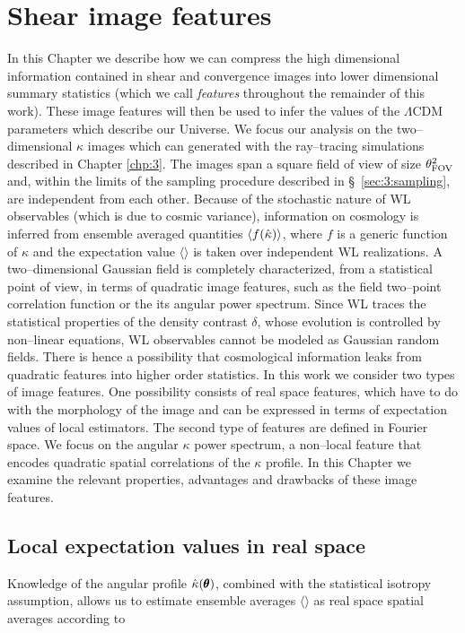 
\chapter{Shear image features}
\lhead[\fancyplain{}{\thepage}]{\fancyplain{}{\rightmark}}
 \thispagestyle{plain}
\setlength{\parindent}{10mm}
\label{chp:4}

In this Chapter we describe how we can compress the high dimensional information contained in shear and convergence images into lower dimensional summary statistics (which we call \textit{features} throughout the remainder of this work). These image features will then be used to infer the values of the $\Lambda$CDM parameters which describe our Universe. We focus our analysis on the two--dimensional $\kappa$ images which can generated with the ray--tracing simulations described in Chapter \ref{chp:3}. The images span a square field of view of size $\theta_{\rm FOV}^2$ and, within the limits of the sampling procedure described in \S~\ref{sec:3:sampling}, are independent from each other. Because of the stochastic nature of WL observables (which is due to cosmic variance), information on cosmology is inferred from ensemble averaged quantities $\langle f(\hat{\kappa})\rangle$, where $f$ is a generic function of $\kappa$ and the expectation value $\langle\rangle$ is taken over independent WL realizations. A two--dimensional Gaussian field is completely characterized, from a statistical point of view, in terms of quadratic image features, such as the field two--point correlation function or the its angular power spectrum. Since WL traces the statistical properties of the density contrast $\delta$, whose evolution is controlled by non--linear equations, WL observables cannot be modeled as Gaussian random fields. There is hence a possibility that cosmological information leaks from quadratic features into higher order statistics. In this work we consider two types of image features. One possibility consists of real space features, which have to do with the morphology of the image and can be expressed in terms of expectation values of local estimators. The second type of features are defined in Fourier space. We focus on the angular $\kappa$ power spectrum, a non--local feature that encodes quadratic spatial correlations of the $\kappa$ profile. In this Chapter we examine the relevant properties, advantages and drawbacks of these image features. 

\section{Local expectation values in real space}
Knowledge of the angular profile $\hat{\kappa}(\pmb{\theta})$, combined with the statistical isotropy assumption, allows us to estimate ensemble averages $\langle\rangle$ as real space spatial averages according to 

